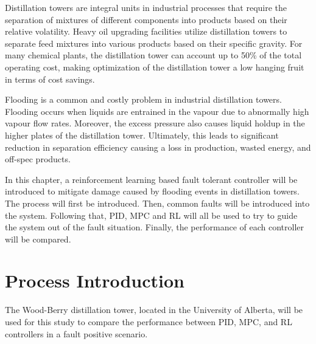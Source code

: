 Distillation towers are integral units in industrial processes that require the separation of
mixtures of different components into products based on their relative volatility. Heavy oil
upgrading facilities utilize distillation towers to separate feed mixtures into various products based on their specific gravity.  For many chemical plants, the distillation tower can account up to 50\% of the total operating cost, making optimization of the distillation tower a low hanging fruit in terms of cost savings.  

Flooding is a common and costly problem in industrial distillation towers.  Flooding occurs when liquids are entrained in the vapour due to abnormally high vapour flow rates.  Moreover, the excess pressure also causes liquid holdup in the higher plates of the distillation tower. Ultimately, this leads to significant reduction in separation efficiency causing a loss in production, wasted energy, and off-spec products.

In this chapter, a reinforcement learning based fault tolerant controller will be introduced to mitigate damage caused by flooding events in distillation towers.  The process will first be introduced. Then, common faults will be introduced into the system.  Following that, PID, MPC and RL will all be used to try to guide the system out of the fault situation.  Finally, the performance of each controller will be compared.

\section{Process Introduction}
The Wood-Berry distillation tower, located in the University of Alberta, will be used for this study to compare the performance between PID, MPC, and RL controllers in a fault positive scenario.  

